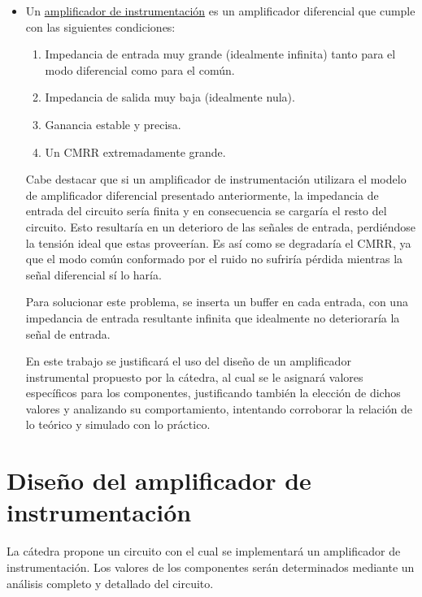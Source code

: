 \documentclass[../../tc_tp3_main.tex]{subfiles}
\begin{document}
\begin{itemize}
	\item Un \underline{amplificador de instrumentación} es un amplificador diferencial que cumple con las siguientes condiciones: \par
	
	\begin{enumerate}
		\item Impedancia de entrada muy grande (idealmente infinita) tanto para el modo diferencial como para el común.
		\item Impedancia de salida muy baja (idealmente nula).
		\item Ganancia estable y precisa.
		\item Un CMRR extremadamente grande.
	\end{enumerate}
	Cabe destacar que si un amplificador de instrumentación utilizara el modelo de amplificador diferencial presentado anteriormente, la impedancia de entrada del circuito sería finita y en consecuencia se cargaría el resto del circuito. Esto resultaría en un deterioro  de las señales de entrada, perdiéndose la tensión ideal que estas proveerían. Es así como se degradaría el CMRR, ya que el modo común conformado por el ruido no sufriría pérdida mientras la señal diferencial sí lo haría.\par
	Para solucionar este problema, se inserta un buffer en cada entrada, con una impedancia de entrada resultante infinita que idealmente no deterioraría la señal de entrada.\par
	
	En este trabajo se justificará el uso del diseño de un amplificador instrumental propuesto por la cátedra, al cual se le asignará valores específicos para los componentes, justificando también la elección de dichos valores y analizando su comportamiento, intentando corroborar la relación de lo teórico y simulado con lo práctico.\par

	\end{itemize}
	
\section{Diseño del amplificador de instrumentación}

La cátedra propone un circuito con el cual se implementará un amplificador de instrumentación. Los valores de los componentes serán determinados mediante un análisis completo y detallado del circuito. 
\end{document}
